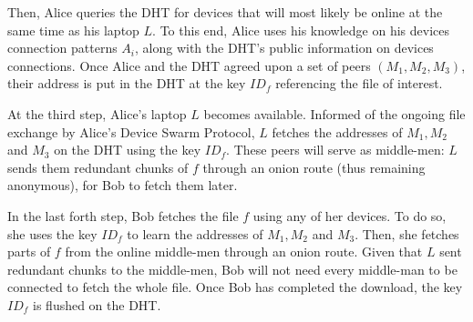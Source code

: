 Then, Alice queries the DHT for devices that will most likely be online at the same time as his laptop $L$.
To this end, Alice uses his knowledge on his devices connection patterns $A_i$, along with the DHT's public information on devices connections.
Once Alice and the DHT agreed upon a set of peers $(M_1, M_2, M_3)$, their address is put in the DHT at the key $ID_f$ referencing the file of interest.

At the third step, Alice's laptop $L$ becomes available. 
Informed of the ongoing file exchange by Alice's Device Swarm Protocol, $L$ fetches the addresses of $M_1, M_2$ and $M_3$ on the DHT using the key $ID_f$.
These peers will serve as middle-men: $L$ sends them redundant chunks of $f$ through an onion route (thus remaining anonymous), for Bob to fetch them later.

In the last forth step, Bob fetches the file $f$ using any of her devices.
To do so, she uses the key $ID_f$ to learn the addresses of $M_1, M_2$ and $M_3$.
Then, she fetches parts of $f$ from the online middle-men through an onion route.
Given that $L$ sent redundant chunks to the middle-men, Bob will not need every middle-man to be connected to fetch the whole file.
Once Bob has completed the download, the key $ID_f$ is flushed on the DHT.


